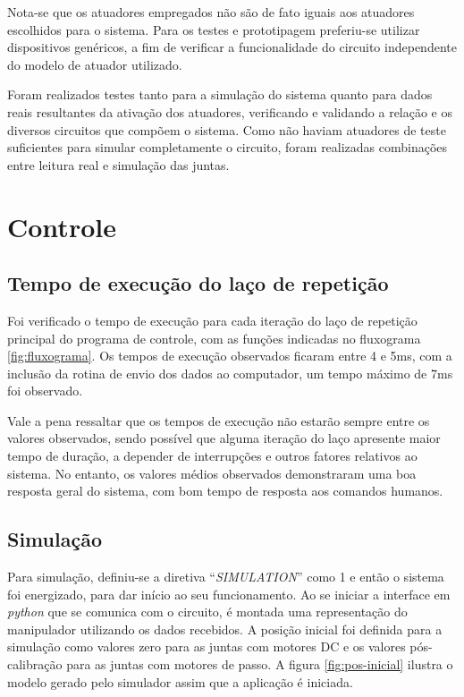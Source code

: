 Nota-se que os atuadores empregados não são de fato iguais aos atuadores escolhidos para o 
sistema. Para os testes e prototipagem preferiu-se utilizar dispositivos genéricos, a fim 
de verificar a funcionalidade do circuito independente do modelo de atuador utilizado.

Foram realizados testes tanto para a simulação do sistema quanto para dados reais resultantes
da ativação dos atuadores, verificando e validando a relação e os diversos circuitos
que compõem o sistema. Como não haviam atuadores de teste suficientes para simular completamente
o circuito, foram realizadas combinações entre leitura real e simulação das juntas.

\section{Controle}

\subsection{Tempo de execução do laço de repetição}

Foi verificado o tempo de execução para cada iteração do laço de repetição principal do
programa de controle, com as funções indicadas no fluxograma \ref{fig:fluxograma}.
Os tempos de execução observados ficaram entre 4 e 5ms, com a inclusão da rotina 
de envio dos dados ao computador, um tempo máximo de 7ms foi observado.

Vale a pena ressaltar que os tempos de execução não estarão sempre entre os valores
observados, sendo possível que alguma iteração do laço apresente maior tempo de 
duração, a depender de interrupções e outros fatores relativos ao sistema. No entanto,
os valores médios observados demonstraram uma boa resposta geral do sistema, com bom
tempo de resposta aos comandos humanos.

\subsection{Simulação}

Para simulação, definiu-se a diretiva ``\textit{SIMULATION}'' como 1 e então o sistema
foi energizado, para dar início ao seu funcionamento. Ao se iniciar a interface
em \textit{python} que se comunica com o circuito, é montada uma representação do 
manipulador utilizando os dados recebidos. A posição inicial foi definida para a simulação
como valores zero para as juntas com motores DC e os valores pós-calibração para as juntas 
com motores de passo. A figura \ref{fig:pos-inicial} ilustra o modelo gerado pelo simulador
assim que a aplicação é iniciada.

